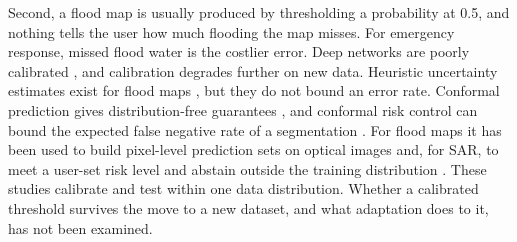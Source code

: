\documentclass[a4paper,fleqn]{cas-sc}
\begin{document}
Second, a flood map is usually produced by thresholding a probability at 0.5, and nothing tells the user how much flooding the map misses. For emergency response, missed flood water is the costlier error. Deep networks are poorly calibrated \citep{guo2017calibration}, and calibration degrades further on new data. Heuristic uncertainty estimates exist for flood maps \citep{gal2016dropout,lakshminarayanan2017ensembles,chen2026uncertaintyflood}, but they do not bound an error rate. Conformal prediction gives distribution-free guarantees \citep{vovk2022alrw,angelopoulos2023gentle}, and conformal risk control can bound the expected false negative rate of a segmentation \citep{angelopoulos2024crc}. For flood maps it has been used to build pixel-level prediction sets on optical images \citep{konidakis2025cpflood} and, for SAR, to meet a user-set risk level and abstain outside the training distribution \citep{li2026crcflood}. These studies calibrate and test within one data distribution. Whether a calibrated threshold survives the move to a new dataset, and what adaptation does to it, has not been examined.
\end{document}
